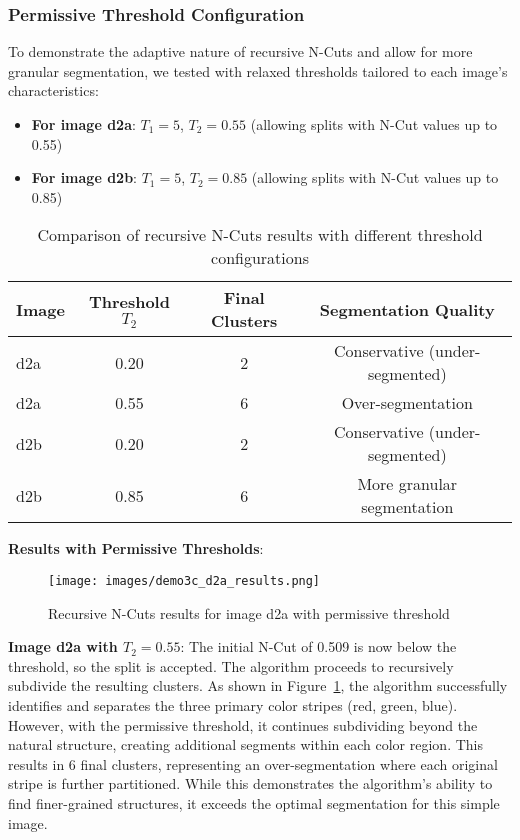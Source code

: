 \documentclass[12pt,a4paper]{article}
\begin{document}
{\subsubsection{Permissive Threshold Configuration}

To demonstrate the adaptive nature of recursive N-Cuts and allow for more granular segmentation, we tested with relaxed thresholds tailored to each image's characteristics:

\begin{itemize}
    \item \textbf{For image d2a}: $T_1=5$, $T_2=0.55$ (allowing splits with N-Cut values up to 0.55)
    \item \textbf{For image d2b}: $T_1=5$, $T_2=0.85$ (allowing splits with N-Cut values up to 0.85)
\end{itemize}

\begin{table}[H]
\centering
\begin{tabular}{@{}lccc@{}}
\toprule
Image & Threshold $T_2$ & Final Clusters & Segmentation Quality \\
\midrule
d2a & 0.20 & 2 & Conservative (under-segmented) \\
d2a & 0.55 & 6 & Over-segmentation \\
d2b & 0.20 & 2 & Conservative (under-segmented) \\
d2b & 0.85 & 6 & More granular segmentation \\
\bottomrule
\end{tabular}
\caption{Comparison of recursive N-Cuts results with different threshold configurations}
\label{tab:demo3c_comparison}
\end{table}

\textbf{Results with Permissive Thresholds}:

\begin{figure}[H]
    \centering
    \texttt{[image: images/demo3c\_d2a\_results.png]}
    \caption{Recursive N-Cuts results for image d2a with permissive threshold}
    \label{fig:demo3c_d2a}
\end{figure}

\textbf{Image d2a with $T_2=0.55$}: The initial N-Cut of 0.509 is now below the threshold, so the split is accepted. The algorithm proceeds to recursively subdivide the resulting clusters. As shown in Figure~\ref{fig:demo3c_d2a}, the algorithm successfully identifies and separates the three primary color stripes (red, green, blue). However, with the permissive threshold, it continues subdividing beyond the natural structure, creating additional segments within each color region. This results in 6 final clusters, representing an over-segmentation where each original stripe is further partitioned. While this demonstrates the algorithm's ability to find finer-grained structures, it exceeds the optimal segmentation for this simple image.

}
\end{document}
